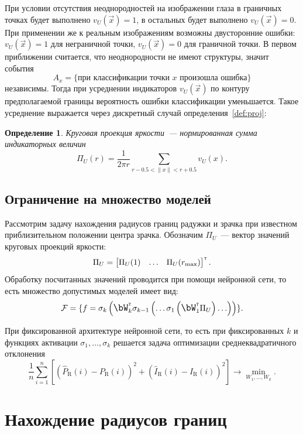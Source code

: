 \documentclass[12pt, twoside]{article}
\newtheorem{definition}{Определение}
\begin{document}
При условии отсутствия неоднородностей на изображении глаза в граничных точках будет выполнено $v_U(\vec{x})=1$, в остальных будет выполнено $v_U(\vec{x})=0$. При применении же к реальным изображениям возможны двусторонние ошибки: $v_U(\vec{x})=1$ для неграничной точки, $v_U(\vec{x})=0$ для граничной точки. В первом приближении считается, что неоднородности не имеют структуры, значит события 
\[
A_x = \{\text{при классификации точки }x\text{ произошла ошибка}\}
\]
независимы. Тогда при усреднении индикаторов $v_U(\vec{x})$ по контуру предполагаемой границы вероятность ошибки классификации уменьшается. Такое усреднение выражается через дискретный случай определения~\ref{def:proj}:
\begin{definition}\label{def:proj_sum}
\emph{Круговая проекция яркости}~--- нормированная сумма индикаторных величин
\[
\Pi_U(r) = \frac{1}{2\pi r} \sum_{r-0.5 < \|x\|<r+0.5} v_U(x).
\] 
\end{definition}

\subsection{Ограничение на множество моделей}

Рассмотрим задачу нахождения радиусов границ радужки и зрачка при известном приблизительном положении центра зрачка. Обозначим $\Pi_U$~--- вектор значений круговых проекций яркости:
\[
\Pi_U = \begin{bmatrix}\Pi_U(1) & \ldots & \Pi_U(r_{\max})\end{bmatrix}\T.
\]
Обработку посчитанных значений проводится при помощи нейронной сети, то есть множество допустимых моделей имеет вид:
\[
\mathcal{F} = \{f = \sigma_k\large\left(\bW_k\T \sigma_{k-1}\large\left(\ldots \sigma_1\left(\bW_1\T \Pi_U\right)\ldots\large\right)\large\right)\}.
\] 

При фиксированной архитектуре нейронной сети, то есть при фиксированных $k$ и функциях активации $\sigma_1, \ldots, \sigma_k$ решается задача оптимизации среднеквадратичного отклонения
\begin{equation}\label{secondproblem}
\frac{1}{n}\sum_{i=1}^n \left[\left(\widehat{P}_\text{R}(i) - P_\text{R}(i)\right)^2 + \left(\widehat{I}_\text{R}(i) - I_\text{R}(i)\right)^2\right] \to \min_{W_1, \ldots, W_k}.
\end{equation}

\section{Нахождение радиусов границ}
\end{document}
